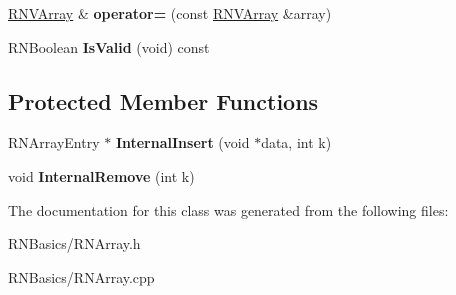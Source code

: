 \begin{DoxyCompactItemize}
\item 
\hyperlink{class_r_n_v_array}{R\+N\+V\+Array} \& {\bfseries operator=} (const \hyperlink{class_r_n_v_array}{R\+N\+V\+Array} \&array)\hypertarget{class_r_n_v_array_a1d451d238dba955a2160f37b9b96edc1}{}\label{class_r_n_v_array_a1d451d238dba955a2160f37b9b96edc1}

\item 
R\+N\+Boolean {\bfseries Is\+Valid} (void) const \hypertarget{class_r_n_v_array_a868881e1a9d60b1572f8dd765d50e829}{}\label{class_r_n_v_array_a868881e1a9d60b1572f8dd765d50e829}

\end{DoxyCompactItemize}
\subsection*{Protected Member Functions}
\begin{DoxyCompactItemize}
\item 
R\+N\+Array\+Entry $\ast$ {\bfseries Internal\+Insert} (void $\ast$data, int k)\hypertarget{class_r_n_v_array_abd21086a910db8bc395a1c574cae0c23}{}\label{class_r_n_v_array_abd21086a910db8bc395a1c574cae0c23}

\item 
void {\bfseries Internal\+Remove} (int k)\hypertarget{class_r_n_v_array_a5c3f85a9e8320b38c1accb5b228d0fda}{}\label{class_r_n_v_array_a5c3f85a9e8320b38c1accb5b228d0fda}

\end{DoxyCompactItemize}


The documentation for this class was generated from the following files\+:\begin{DoxyCompactItemize}
\item 
R\+N\+Basics/R\+N\+Array.\+h\item 
R\+N\+Basics/R\+N\+Array.\+cpp\end{DoxyCompactItemize}
